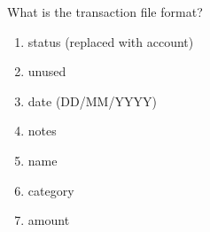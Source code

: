\documentclass[12pt,letterpaper]{article}
\begin{document}
\begin{framed}
    \begin{minipage}[t][3in][t]{5in}
        \Large
        What is the transaction file format?\\
        \normalsize
        \begin{enumerate}
            \item status (replaced with account)
            \item unused
            \item date (DD/MM/YYYY)
            \item notes
            \item name
            \item category
            \item amount
        \end{enumerate}
    \end{minipage}
\end{framed}
\end{document}

